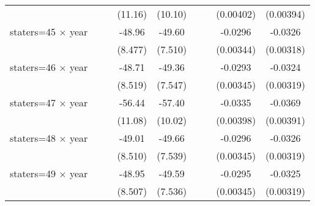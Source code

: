 {\begin{longtable}{l*{8}{c}}
                    &                     &                     &     (11.16)         &     (10.10)         &                     &                     &   (0.00402)         &   (0.00394)         \\
[1em]
staters=45 $\times$ year&                     &                     &      -48.96\sym{***}&      -49.60\sym{***}&                     &                     &     -0.0296\sym{***}&     -0.0326\sym{***}\\
                    &                     &                     &     (8.477)         &     (7.510)         &                     &                     &   (0.00344)         &   (0.00318)         \\
[1em]
staters=46 $\times$ year&                     &                     &      -48.71\sym{***}&      -49.36\sym{***}&                     &                     &     -0.0293\sym{***}&     -0.0324\sym{***}\\
                    &                     &                     &     (8.519)         &     (7.547)         &                     &                     &   (0.00345)         &   (0.00319)         \\
[1em]
staters=47 $\times$ year&                     &                     &      -56.44\sym{***}&      -57.40\sym{***}&                     &                     &     -0.0335\sym{***}&     -0.0369\sym{***}\\
                    &                     &                     &     (11.08)         &     (10.02)         &                     &                     &   (0.00398)         &   (0.00391)         \\
[1em]
staters=48 $\times$ year&                     &                     &      -49.01\sym{***}&      -49.66\sym{***}&                     &                     &     -0.0296\sym{***}&     -0.0326\sym{***}\\
                    &                     &                     &     (8.510)         &     (7.539)         &                     &                     &   (0.00345)         &   (0.00319)         \\
[1em]
staters=49 $\times$ year&                     &                     &      -48.95\sym{***}&      -49.59\sym{***}&                     &                     &     -0.0295\sym{***}&     -0.0325\sym{***}\\
                    &                     &                     &     (8.507)         &     (7.536)         &                     &                     &   (0.00345)         &   (0.00319)         \\

\end{longtable}}
